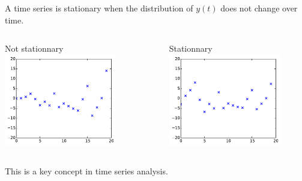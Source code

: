 \documentclass{beamer}
\begin{document}
\begin{frame}{}
 A time series is stationary when the distribution of $y(t)$ does not change over time.\\
\vspace{5mm}
\begin{columns}[c]
\column{5cm}
\begin{center}
Not stationnary
\includegraphics[height=4cm]{figures/2_stationnaryno}
\end{center}
\column{5cm}
\begin{center}
Stationnary
\includegraphics[height=4cm]{figures/2_stationnary}
\end{center}
\end{columns}
\vspace{5mm}
This is a key concept in time series analysis.
\end{frame}
\end{document}
